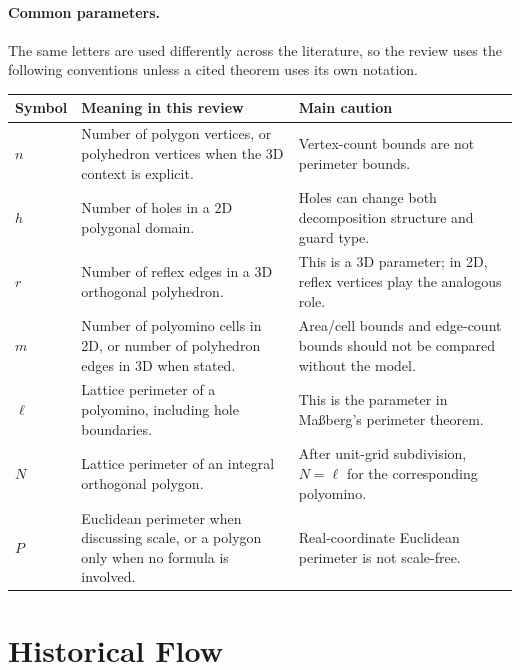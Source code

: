 \documentclass[11pt]{article}
\begin{document}
\paragraph{Common parameters.}
The same letters are used differently across the literature, so the review
uses the following conventions unless a cited theorem uses its own notation.

\begin{center}
\small
\setlength{\tabcolsep}{5pt}
\renewcommand{\arraystretch}{1.12}
\begin{tabularx}{0.94\textwidth}{>{\raggedright\arraybackslash}p{} Y Y}
\toprule
Symbol & Meaning in this review & Main caution \\
\midrule
$n$ & Number of polygon vertices, or polyhedron vertices when the 3D context is
explicit. & Vertex-count bounds are not perimeter bounds. \\
$h$ & Number of holes in a 2D polygonal domain. & Holes can change both
decomposition structure and guard type. \\
$r$ & Number of reflex edges in a 3D orthogonal polyhedron. & This is a 3D
parameter; in 2D, reflex vertices play the analogous role. \\
$m$ & Number of polyomino cells in 2D, or number of polyhedron edges in 3D
when stated. & Area/cell bounds and edge-count bounds should not be compared
without the model. \\
$\ell$ & Lattice perimeter of a polyomino, including hole boundaries. & This is
the parameter in Ma{\ss}berg's perimeter theorem. \\
$N$ & Lattice perimeter of an integral orthogonal polygon. & After unit-grid
subdivision, $N=\ell$ for the corresponding polyomino. \\
$P$ & Euclidean perimeter when discussing scale, or a polygon only when no
formula is involved. & Real-coordinate Euclidean perimeter is not scale-free. \\
\bottomrule
\end{tabularx}
\end{center}

\section{Historical Flow}
\end{document}
